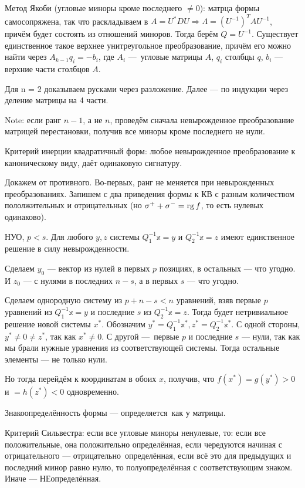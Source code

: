 \documentclass[12pt, a4paper]{article}
\begin{document}
Метод Якоби (угловые миноры кроме последнего $\neq 0$): матрца формы самосопряжена, 
так что раскладываем в $A = U^*DU \Rightarrow \Lambda = (U^{-1})^T A U^{-1}$, причём будет состоять из отношений миноров.
Тогда берём $Q = U^{-1}$.
Существует единственное такое верхнее унитреугольное преобразование, причём его можно найти через $A_{k -1} q_i = -b_i$, где $A_i$ — угловые матрицы $A$, $q_i$ столбцы $q$, $b_i$ — верхние части столбцов $A$.

Для n = 2 доказываем русками через разложение. Далее — по индукции через деление матрицы на 4 части.

Note: если ранг $n - 1$, а не $n$, проведём сначала невырожденное преобразование матрицей перестановки, получив все миноры кроме последнего не нули.



Критерий инерции квадратичный форм: любое невырожденное преобразование к каноническому виду, даёт одинаковую сигнатуру.

Докажем от противного. Во-первых, ранг не меняется при невырожденных преобразованиях. 
Запишем с два приведения формы к КВ с разным количеством пололжительных и отрицательных (но $\sigma^+ + \sigma^- = \operatorname{rg} f$, то есть нулевых одинаково).

НУО, $p < s$. Для любого $y, z$ системы $Q_1^{-1} \mathbb{x} = y$ и $Q_2^{-1} \mathbb{x} = z$ имеют единственное решение в силу невырожденности.

Сделаем $y_0$ — вектор из нулей в первых $p$ позициях, в остальных — что угодно. И $z_0$ — с нулями в последних $n - s$, а в первых $s$ — что угодно.

Сделаем однородную систему из $p + n - s < n$ уравнений, взяв первые $p$ уравнений из $Q_1^{-1} \mathbb{x} = y$ 
и последние $s$ из $Q_2^{-1} \mathbb{x} = z$. Тогда будет нетривиальное решение новой системы $x^*$.
Обозначим $y^* = Q_1^{-1} \mathbb{x^*}, z^* = Q_2^{-1} \mathbb{x^*}$. С одной стороны, $y^* \neq 0 \neq z^*$, так как $x^* \neq 0$.
С другой — первые $p$ и последние $s$ — нули, так как мы брали нужные уравнения из соответствующей системы.
Тогда остальные элементы — не только нули.

Но тогда перейдём к координатам в обоих $x$, получив, что $f(x^*) = g(y^*) > 0$ и $= h(z^*) < 0$ одновременно. 

Знакоопределённость формы — определяется как у матрицы.

Критерий Сильвестра: если все угловые миноры ненулевые, то: 
если все положительные, она положительно определённая, если чередуются начиная с отрицательного — отрицательно определённая,
если всё это для предыдущих и последний минор равно нулю, то полуопределённая с соответствующим знаком. Иначе — НЕопределённая.
\end{document}
